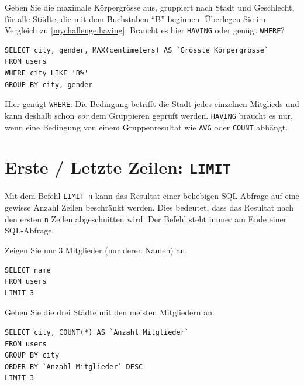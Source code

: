 \begin{mychallenge}
  Geben Sie die maximale Körpergrösse aus, gruppiert nach Stadt und Geschlecht, für alle Städte, die mit dem Buchstaben \enquote{B} beginnen. Überlegen Sie im Vergleich zu \cref{mychallenge:having}: Braucht es hier \lstinline|HAVING| oder genügt \lstinline|WHERE|?
  \begin{myanswer}
    \begin{lstlisting}
SELECT city, gender, MAX(centimeters) AS `Grösste Körpergrösse`
FROM users
WHERE city LIKE 'B%'
GROUP BY city, gender
\end{lstlisting}
    Hier genügt \lstinline|WHERE|: Die Bedingung betrifft die Stadt jedes einzelnen Mitglieds und kann deshalb schon \textit{vor} dem Gruppieren geprüft werden. \lstinline|HAVING| braucht es nur, wenn eine Bedingung von einem Gruppenresultat wie \lstinline|AVG| oder \lstinline|COUNT| abhängt.
  \end{myanswer}
\end{mychallenge}

\section{Erste / Letzte Zeilen: \texorpdfstring{\lstinline|LIMIT|}{LIMIT}}
Mit dem Befehl \lstinline|LIMIT n| kann das Resultat einer beliebigen \gls{SQL}-Abfrage auf eine gewisse Anzahl Zeilen beschränkt werden. Dies bedeutet, dass das Resultat nach den ersten \texttt{n} Zeilen abgeschnitten wird. Der Befehl steht immer am Ende einer SQL-Abfrage.

\begin{myexercise}
  Zeigen Sie nur 3 Mitglieder (nur deren Namen) an.
  \begin{myanswer}
    \begin{lstlisting}
SELECT name
FROM users
LIMIT 3
\end{lstlisting}
  \end{myanswer}
\end{myexercise}

\begin{myexercise}
  Geben Sie die drei Städte mit den meisten Mitgliedern an.
  \begin{myanswer}
    \begin{lstlisting}
SELECT city, COUNT(*) AS `Anzahl Mitglieder`
FROM users
GROUP BY city
ORDER BY `Anzahl Mitglieder` DESC
LIMIT 3
\end{lstlisting}
  \end{myanswer}
\end{myexercise}

